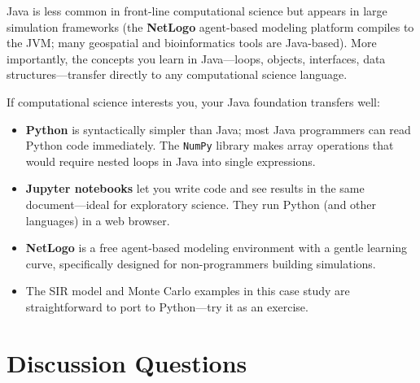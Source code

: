 \documentclass[11pt,letterpaper]{article}
\begin{document}
Java is less common in front-line computational science but appears in large simulation frameworks (the \textbf{NetLogo} agent-based modeling platform compiles to the JVM; many geospatial and bioinformatics tools are Java-based). More importantly, the concepts you learn in Java---loops, objects, interfaces, data structures---transfer directly to any computational science language.

\begin{tipbox}
If computational science interests you, your Java foundation transfers well:
\begin{itemize}[itemsep=3pt]
    \item \textbf{Python} is syntactically simpler than Java; most Java programmers can read Python code immediately. The \texttt{NumPy} library makes array operations that would require nested loops in Java into single expressions.
    \item \textbf{Jupyter notebooks} let you write code and see results in the same document---ideal for exploratory science. They run Python (and other languages) in a web browser.
    \item \textbf{NetLogo} is a free agent-based modeling environment with a gentle learning curve, specifically designed for non-programmers building simulations.
    \item The SIR model and Monte Carlo examples in this case study are straightforward to port to Python---try it as an exercise.
\end{itemize}
\end{tipbox}

\section*{Discussion Questions}
\end{document}
